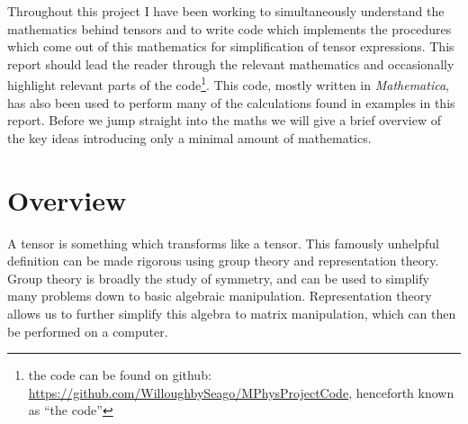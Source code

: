 \documentclass[fleqn]{NotesClass}
\newcommand{\Mathematica}{\textit{Mathematica}}
\begin{document}
    Throughout this project I have been working to simultaneously understand the mathematics behind tensors and to write code which implements the procedures which come out of this mathematics for simplification of tensor expressions.
    This report should lead the reader through the relevant mathematics and occasionally highlight relevant parts of the code\footnote{the code can be found on github: \url{https://github.com/WilloughbySeago/MPhysProjectCode}, henceforth known as \enquote{the code}}.
    This code, mostly written in \Mathematica{}, has also been used to perform many of the calculations found in examples in this report.
    Before we jump straight into the maths we will give a brief overview of the key ideas introducing only a minimal amount of mathematics.
    
    \section{Overview}\label{sec:overview}
    A tensor is something which transforms like a tensor.
    This famously unhelpful definition can be made rigorous using group theory and representation theory.
    Group theory is broadly the study of symmetry, and can be used to simplify many problems down to basic algebraic manipulation.
    Representation theory allows us to further simplify this algebra to matrix manipulation, which can then be performed on a computer.
    
\end{document}
